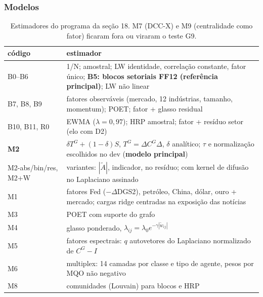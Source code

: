 \documentclass[11pt,a4paper]{article}
\begin{document}
\subsubsection*{Modelos}
\begin{table}[h]
\centering\footnotesize
\begin{tabularx}{\textwidth}{lL}
\toprule
código & estimador \\
\midrule
B0--B6 & 1/N; amostral; LW identidade, correlação constante, fator único; \textbf{B5: blocos setoriais FF12 (referência principal)}; LW não linear \\
B7, B8, B9 & fatores observáveis (mercado, 12 indústrias, tamanho, momentum); POET; fator + glasso residual \\
B10, B11, R0 & EWMA ($\lambda=0{,}97$); HRP amostral; fator + resíduo setor (elo com D2) \\
\textbf{M2} & $\delta T^G+(1-\delta)S$, $T^G=\Delta C^G\Delta$, $\delta$ analítico; $\tau$ e normalização escolhidos no dev (\textbf{modelo principal}) \\
M2-abs/bin/res, M2+W & variantes: $|\tilde A|$, indicador, no resíduo; com kernel de difusão no Laplaciano assinado \\
M1 & fatores Fed ($-\Delta$DGS2), petróleo, China, dólar, ouro + mercado; cargas ridge centradas na exposição das notícias \\
M3 & POET com suporte do grafo \\
M4 & glasso ponderado, $\lambda_{ij}=\lambda_0e^{-\gamma|\tilde w_{ij}|}$ \\
M5 & fatores espectrais: $q$ autovetores do Laplaciano normalizado de $C^G-I$ \\
M6 & multiplex: 14 camadas por classe e tipo de agente, pesos por MQO não negativo \\
M8 & comunidades (Louvain) para blocos e HRP \\
\bottomrule
\end{tabularx}
\caption{Estimadores do programa da seção 18. M7 (DCC-X) e M9 (centralidade como fator) ficaram fora ou viraram o teste G9.}
\end{table}
\end{document}
